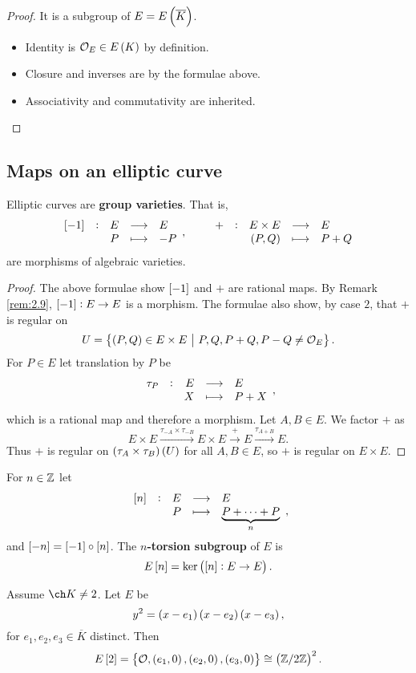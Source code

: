 \begin{proof}
It is a subgroup of $ E = E\br{\overline{K}} $.
\begin{itemize}
\item Identity is $ \OOO_E \in E\br{K} $ by definition.
\item Closure and inverses are by the formulae above.
\item Associativity and commutativity are inherited.
\end{itemize}
\end{proof}

\pagebreak

\subsection{Maps on an elliptic curve}

\begin{theorem}
\label{thm:4.4}
Elliptic curves are \textbf{group varieties}. That is,
$$ \function[\sbr{-1}]{E}{E}{P}{-P}, \qquad \function[+]{E \times E}{E}{\br{P, Q}}{P + Q} $$
are morphisms of algebraic varieties.
\end{theorem}

\begin{proof}
The above formulae show $ \sbr{-1} $ and $ + $ are rational maps. By Remark \ref{rem:2.9}, $ \sbr{-1} : E \to E $ is a morphism. The formulae also show, by case $ 2 $, that $ + $ is regular on
$$ U = \cbr{\br{P, Q} \in E \times E \st P, Q, P + Q, P - Q \ne \OOO_E}. $$
For $ P \in E $ let translation by $ P $ be
$$ \function[\tau_P]{E}{E}{X}{P + X}, $$
which is a rational map and therefore a morphism. Let $ A, B \in E $. We factor $ + $ as
$$ E \times E \xrightarrow{\tau_{-A} \times \tau_{-B}} E \times E \xrightarrow{+} E \xrightarrow{\tau_{A + B}} E. $$
Thus $ + $ is regular on $ \br{\tau_A \times \tau_B}\br{U} $ for all $ A, B \in E $, so $ + $ is regular on $ E \times E $.
\end{proof}

\begin{definition*}
For $ n \in \mathbb{Z} $ let
$$ \function[\sbr{n}]{E}{E}{P}{\underbrace{P + \dots + P}_n}, $$
and $ \sbr{-n} = \sbr{-1} \circ \sbr{n} $. The \textbf{$ n $-torsion subgroup} of $ E $ is
$$ E\sbr{n} = \ker \br{\sbr{n} : E \to E}. $$
\end{definition*}

\begin{lemma}
\label{lem:4.5}
Assume $ \ch K \ne 2 $. Let $ E $ be
$$ y^2 = \br{x - e_1}\br{x - e_2}\br{x - e_3}, $$
for $ e_1, e_2, e_3 \in \overline{K} $ distinct. Then
$$ E\sbr{2} = \cbr{\OOO, \br{e_1, 0}, \br{e_2, 0}, \br{e_3, 0}} \cong \br{\ZZ / 2\ZZ}^2. $$
\end{lemma}

